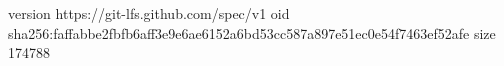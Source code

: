 version https://git-lfs.github.com/spec/v1
oid sha256:faffabbe2fbfb6aff3e9e6ae6152a6bd53cc587a897e51ec0e54f7463ef52afe
size 174788
